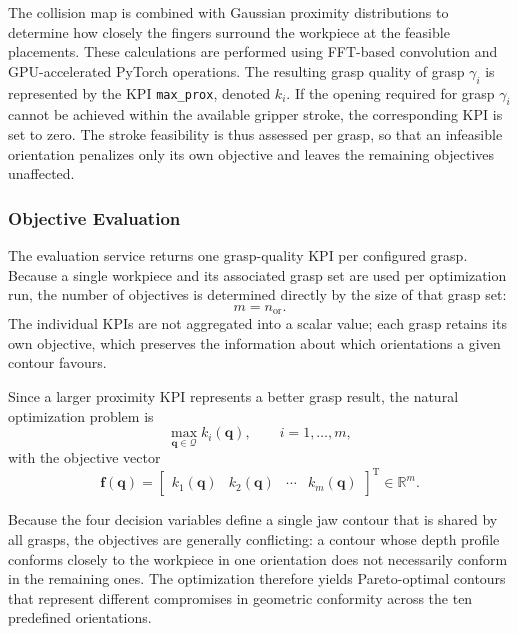 The collision map is combined with Gaussian proximity distributions to determine how closely the
fingers surround the workpiece at the feasible placements. These calculations are performed using
FFT-based convolution and GPU-accelerated PyTorch operations. The resulting grasp quality of grasp
$\gamma_i$ is represented by the KPI \texttt{max\_prox}, denoted $k_i$. If the opening required for
grasp $\gamma_i$ cannot be achieved within the available gripper stroke, the corresponding KPI is
set to zero. The stroke feasibility is thus assessed per grasp, so that an infeasible orientation
penalizes only its own objective and leaves the remaining objectives unaffected.

\subsubsection{Objective Evaluation}
\label{sec:two_finger_objective_evaluation}

The evaluation service returns one grasp-quality KPI per configured grasp. Because a single
workpiece and its associated grasp set are used per optimization run, the number of objectives is
determined directly by the size of that grasp set:
\begin{equation}
    m = n_{\mathrm{or}} .
\end{equation}
The individual KPIs are not aggregated into a scalar value; each grasp retains its own objective,
which preserves the information about which orientations a given contour favours.

Since a larger proximity KPI represents a better grasp result, the natural optimization problem is
\begin{equation}
    \max_{\mathbf{q}\in\mathcal{Q}} k_i(\mathbf{q}),
    \qquad
    i = 1,\ldots,m ,
\end{equation}
with the objective vector
\begin{equation}
    \mathbf{f}(\mathbf{q})
    =
    \begin{bmatrix}
        k_1(\mathbf{q}) &
        k_2(\mathbf{q}) &
        \cdots &
        k_{m}(\mathbf{q})
    \end{bmatrix}^{\mathrm{T}}
    \in \mathbb{R}^{m}.
\end{equation}

Because the four decision variables define a single jaw contour that is shared by all grasps, the
objectives are generally conflicting: a contour whose depth profile conforms closely to the
workpiece in one orientation does not necessarily conform in the remaining ones. The optimization
therefore yields Pareto-optimal contours that represent different compromises in geometric
conformity across the ten predefined orientations.

